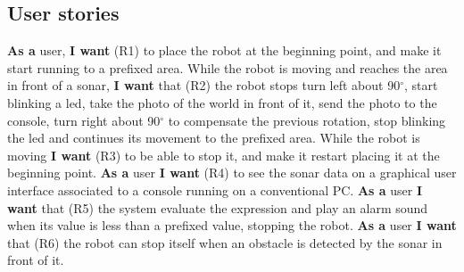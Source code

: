 \subsection{User stories}
\textbf{As a} user, \textbf{I want} (R1) to place the robot at the beginning point, and make it start running to a prefixed area. While the robot is moving and reaches the area in front of a sonar, \textbf{I want} that (R2) the robot stops turn left about 90$^\circ$, start blinking a led, take the photo of the world in front of it, send the photo to the console, turn right about 90$^\circ$ to compensate the previous rotation, stop blinking the led and continues its movement to the prefixed area. While the robot is moving \textbf{I want} (R3) to be able to stop it, and make it restart placing it at the beginning point. \textbf{As a} user \textbf{I want} (R4) to see the sonar data on a graphical user interface associated to a console running on a conventional PC. \textbf{As a} user \textbf{I want} that (R5) the system evaluate the expression and play an alarm sound when its value is less than a prefixed value, stopping the robot. \textbf{As a} user \textbf{I want} that (R6) the robot can stop itself when an obstacle is detected by the sonar in front of it.